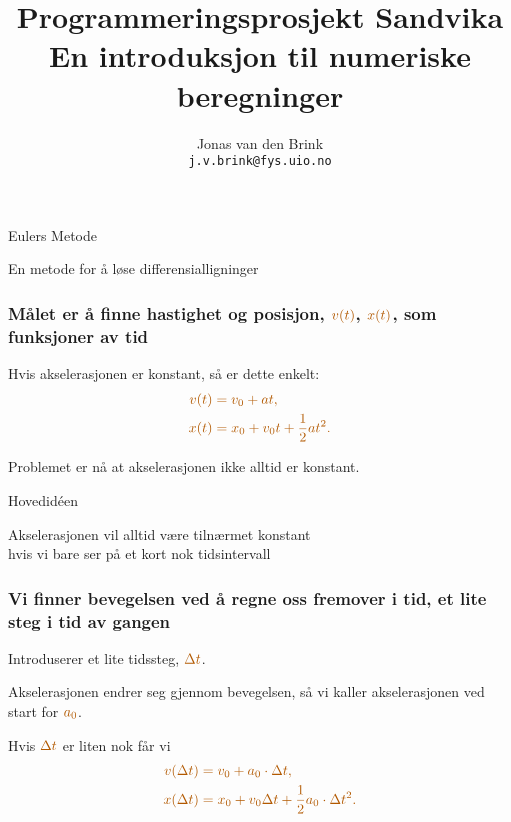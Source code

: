 \documentclass[english, 12pt]{beamer}
\title{Programmeringsprosjekt Sandvika \\ {\small En introduksjon til numeriske beregninger}}
\author{Jonas van den Brink \\ \texttt{j.v.brink@fys.uio.no}}
\institute{\alrt Simula Research Laboratory \\ Oslo, Norway}
\newcommand{\alrt}{\color{AlertColor}}
\begin{document}
\pagestyle{empty}


\begin{frame}[fragile]
\begin{center}
{\Huge \color{DarkFern} Eulers Metode}

\vspace{1cm}

En metode for å løse differensialligninger
\end{center}
\end{frame}

\begin{frame}
\frametitle{Målet er å finne hastighet og posisjon, $\alrt v(t)$, $\alrt x(t)$, som funksjoner av tid}

Hvis akselerasjonen er konstant, så er dette enkelt:
\begin{align*}
\alrt v(t) &\alrt= v_0 + at, \\
\alrt x(t) &\alrt= x_0 + v_0t + \frac{1}{2}at^2.
\end{align*}

Problemet er nå at akselerasjonen ikke alltid er konstant.
\end{frame}

\begin{frame}[fragile]
\begin{center}
{\Huge \color{DarkFern} Hovedidéen}

\vspace{1cm}

Akselerasjonen vil alltid være tilnærmet konstant \\ hvis vi bare ser på et kort nok tidsintervall
\end{center}
\end{frame}

\begin{frame}[fragile]
\frametitle{Vi finner bevegelsen ved å regne oss fremover i tid, et lite steg i tid av gangen}

Introduserer et lite tidssteg, $\alrt \Delta t$. 

 {
Akselerasjonen endrer seg gjennom bevegelsen, så vi kaller akselerasjonen ved start for $\alrt a_0$.
}

 {	
Hvis $\alrt \Delta t$ er liten nok får vi
\begin{align*}
\alrt v(\Delta t) &\alrt= v_0 + a_0 \cdot \Delta t, \\
\alrt x(\Delta t) &\alrt= x_0 + v_0\Delta t + \frac{1}{2}a_0 \cdot \Delta t^2.
\end{align*}
}
\end{frame}
\end{document}
